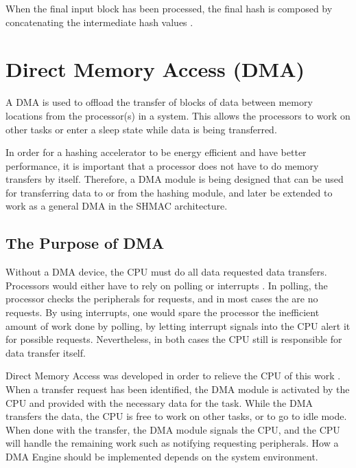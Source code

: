 When the final input block has been processed, the final hash is composed by
concatenating the intermediate hash values \cite{sha-spec}.

\section{Direct Memory Access (DMA)}

A DMA is used to offload the transfer of blocks of data between memory locations from
the processor(s) in a system. This allows the processors to work on other tasks or enter
a sleep state while data is being transferred.

In order for a hashing accelerator to be energy efficient and have better performance,
it is important that a processor does not have to do memory transfers by itself. Therefore,
a DMA module is being designed that can be used for transferring data to or from the hashing
module, and later be extended to work as a general DMA in the SHMAC architecture.

\subsection{The Purpose of DMA}

Without a DMA device, the CPU must do all data requested data transfers.
Processors would either have to rely on polling or interrupts \cite{computer-construction}.
In polling, the processor checks the peripherals for requests, and in most cases the are no requests.
By using interrupts, one would spare the processor the inefficient amount of work done by polling, by letting interrupt signals into the CPU alert it for possible requests.
Nevertheless, in both cases the CPU still is responsible for data transfer itself.



Direct Memory Access was developed in order to relieve the CPU of this work \cite{computer-construction}.
When a transfer request has been identified, the DMA module is activated by the CPU and provided with the necessary data for the task.
While the DMA transfers the data, the CPU is free to work on other tasks, or to go to idle mode.
When done with the transfer, the DMA module signals the CPU, and the CPU will handle the remaining work such as notifying requesting peripherals. How a DMA Engine should be implemented depends on the system environment.

